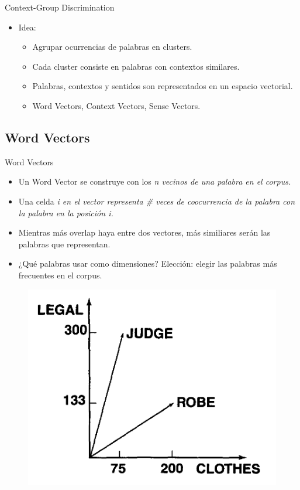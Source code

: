 \documentclass[xcolor=x11names,compress]{beamer}
\renewcommand{\(}{\begin{columns}}
\renewcommand{\)}{\end{columns}}
\newcommand{\<}[1]{\begin{column}{#1}}
\renewcommand{\>}{\end{column}}
\begin{document}
\begin{frame}{Context-Group Discrimination}
\begin{itemize}
\item Idea:
\begin{itemize}
\item Agrupar ocurrencias de palabras en clusters.
\item Cada cluster consiste en palabras con contextos similares.
\item Palabras, contextos y sentidos son representados en un espacio vectorial.
\item Word Vectors, Context Vectors, Sense Vectors.
\end{itemize}
\end{itemize}
\end{frame}



\subsection{Word Vectors}
\begin{frame}{Word Vectors}
\begin{itemize}
\item Un Word Vector se construye con los \em n \em vecinos de una palabra en el corpus.
\item Una celda \em i \em en el vector representa \# veces de coocurrencia de la palabra con la palabra en la posición \em i\em.
\item Mientras más overlap haya entre dos vectores, más similiares serán las palabras que representan.
\item ¿Qué palabras usar como dimensiones? Elección: elegir las palabras más frecuentes en el corpus.
\end{itemize}
\begin{figure}
\centering
\includegraphics[scale=0.24, keepaspectratio=True, natwidth=800,natheight=600]{word_vector.png}
\end{figure}
\end{frame}
\end{document}
